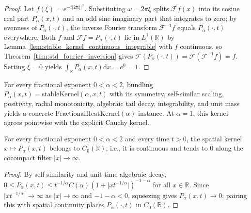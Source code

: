 \begin{proof}
\leanok
Let $f(\xi) = e^{-t \lvert 2\pi \xi \rvert^\alpha}$. Substituting $\omega = 2\pi\xi$ splits $\mathcal{F}f(x)$ into its cosine real part $P_\alpha(x, t)$ and an odd sine imaginary part that integrates to zero; by evenness of $P_\alpha(\cdot, t)$, the inverse Fourier transform $\mathcal{F}^{-1}f$ equals $P_\alpha(\cdot, t)$ everywhere. Both $f$ and $\mathcal{F}f = P_\alpha(\cdot, t)$ lie in $L^1(\mathbb{R})$ by Lemma~\ref{lem:stable_kernel_continuous_integrable} with $f$ continuous, so Theorem~\ref{thm:std_fourier_inversion} gives $\mathcal{F}(P_\alpha(\cdot, t)) = \mathcal{F}(\mathcal{F}^{-1}f) = f$. Setting $\xi = 0$ yields $\int_{\mathbb{R}} P_\alpha(x, t) \mathrm{d}x = e^0 = 1$.
\end{proof}

\begin{definition}\label{def:stable_heat_kernel}
\leanok
For every fractional exponent $0 < \alpha < 2$, bundling $P_\alpha(x, t) = \mathrm{stableKernel}(\alpha, x, t)$ with its symmetry, self-similar scaling, positivity, radial monotonicity, algebraic tail decay, integrability, and unit mass yields a concrete $\mathrm{FractionalHeatKernel}(\alpha)$ instance. At $\alpha = 1$, this kernel agrees pointwise with the explicit Cauchy kernel.
\end{definition}

\begin{theorem}\label{thm:stable_kernel_c0}
\leanok
For every fractional exponent $0 < \alpha < 2$ and every time $t > 0$, the spatial kernel $x \mapsto P_\alpha(x, t)$ belongs to $C_0(\mathbb{R})$, i.e., it is continuous and tends to $0$ along the cocompact filter $\lvert x \rvert \to \infty$.
\end{theorem}

\begin{proof}
\leanok
By self-similarity and unit-time algebraic decay, $0 \le P_\alpha(x, t) \le t^{-1/\alpha} C(\alpha) (1 + \lvert x t^{-1/\alpha} \rvert)^{-1-\alpha}$ for all $x \in \mathbb{R}$. Since $\lvert x t^{-1/\alpha} \rvert \to \infty$ as $\lvert x \rvert \to \infty$ and $-1 - \alpha < 0$, squeezing gives $P_\alpha(x, t) \to 0$; pairing this with spatial continuity places $P_\alpha(\cdot, t)$ in $C_0(\mathbb{R})$.
\end{proof}
